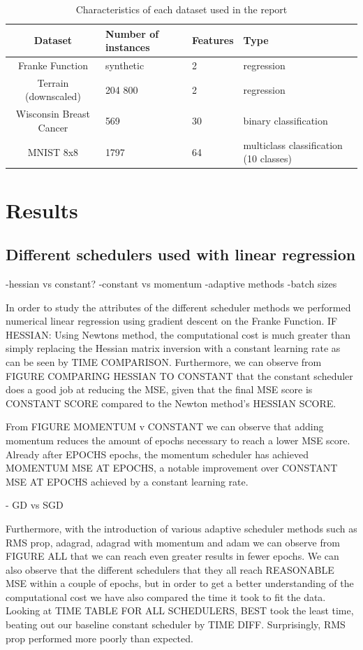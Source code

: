 \documentclass[onecolumn,10pt,cleanfoot]{asme2ej}
\begin{document}
\begin{table}[h]
\caption{Characteristics of each dataset used in the report}
\begin{center}
\label{datasettable}
\begin{tabular}{| c | l | l | l |}
\hline
Dataset & Number of instances & Features & Type \\
\hline
Franke Function & synthetic & 2 & regression \\
Terrain (downscaled) & 204 800 & 2 & regression \\
Wisconsin Breast Cancer & 569 & 30 & binary classification \\
MNIST 8x8 & 1797 & 64 & multiclass classification (10 classes) \\
\hline
\end{tabular}
\end{center}
\end{table}

\section{Results}

\subsection{Different schedulers used with linear regression}

-hessian vs constant?
-constant vs momentum
-adaptive methods
-batch sizes

In order to study the attributes of the different scheduler methods we performed numerical linear regression using gradient descent on the Franke Function. IF HESSIAN: Using Newtons method, the computational cost is much greater than simply replacing the Hessian matrix inversion with a constant learning rate as can be seen by TIME COMPARISON. Furthermore, we can observe from FIGURE COMPARING HESSIAN TO CONSTANT that the constant scheduler does a good job at reducing the MSE, given that the final MSE score is CONSTANT SCORE compared to the Newton method's HESSIAN SCORE.

From FIGURE MOMENTUM v CONSTANT we can observe that adding momentum reduces the amount of epochs necessary to reach a lower MSE score. Already after EPOCHS epochs, the momentum scheduler has achieved MOMENTUM MSE AT EPOCHS, a notable improvement over CONSTANT MSE AT EPOCHS achieved by a constant learning rate.

- GD vs SGD

Furthermore, with the introduction of various adaptive scheduler methods such as RMS prop, adagrad, adagrad with momentum and adam we can observe from FIGURE ALL that we can reach even greater results in fewer epochs. We can also observe that the different schedulers that they all reach REASONABLE MSE within a couple of epochs, but in order to get a better understanding of the computational cost we have also compared the time it took to fit the data. Looking at TIME TABLE FOR ALL SCHEDULERS, BEST took the least time, beating out our baseline constant scheduler by TIME DIFF. Surprisingly, RMS prop performed more poorly than expected.
\end{document}
